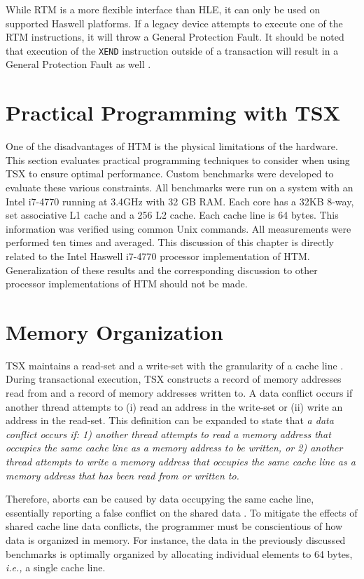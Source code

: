 \documentclass{sig-alternate}
\begin{document}
While RTM is a more flexible interface than HLE, it can only be used on supported Haswell
platforms.  If a legacy device attempts to execute one of the RTM instructions, it will
throw a General Protection Fault.  It should be noted that execution of the \texttt{XEND}
instruction outside of a transaction will result in a General Protection Fault as well
\cite{intel_opt_man}.

\section{Practical Programming with TSX}

One of the disadvantages of HTM is the physical limitations of the hardware.
This section evaluates practical programming techniques to consider when using
TSX to ensure optimal performance.  Custom benchmarks were developed to
evaluate these various constraints.  All benchmarks were run on a system with
an Intel i7-4770 running at 3.4GHz with 32 GB RAM.  Each core has a 32KB 8-way,
set associative L1 cache and a 256 L2 cache.  Each cache line is 64 bytes.
This information was verified using common Unix commands.  All measurements
were performed ten times and averaged.  This discussion of this chapter is
directly related to the Intel Haswell i7-4770 processor implementation of HTM.
Generalization of these results and the corresponding discussion to other
processor implementations of HTM should not be made. 

\section{Memory Organization}

TSX maintains a read-set and a write-set with the granularity of a cache line
\cite{intel_prog_ref}.  During transactional execution, TSX constructs a record
of memory addresses read from and a record of memory addresses written to.  A
data conflict occurs if another thread attempts to (i) read an address in the
write-set or (ii) write an address in the read-set.  This definition can be
expanded to state that \textit{a data conflict occurs if: 1) another thread
attempts to read a memory address that occupies the same cache line as a memory
address to be written, or 2) another thread attempts to write a memory address
that occupies the same cache line as a memory address that has been read from
or written to.}

Therefore, aborts can be caused by data occupying the same cache line, essentially
reporting a false conflict on the shared data \cite{intel_opt_man}.  To mitigate the
effects of shared cache line data conflicts, the programmer must be conscientious of how
data is organized in memory.  For instance, the data in the previously discussed
benchmarks is optimally organized by allocating individual elements to 64 bytes,
\emph{i.e.,} a single cache line.
\end{document}

